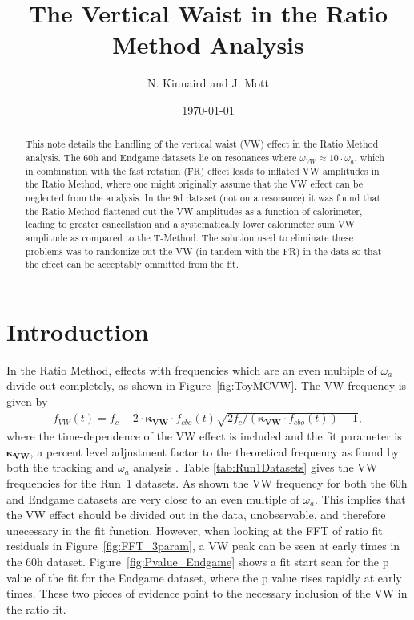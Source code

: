 \documentclass[12pt,letterpaper]{article}
\title{The Vertical Waist in the Ratio Method Analysis}
\author{N. Kinnaird and J. Mott}
\date{\today}
\newcommand{\figref}[1]{Figure~\ref{#1}}
\def\wa{$\omega_{a}$\xspace}
\begin{document}
\maketitle

\begin{abstract}
This note details the handling of the vertical waist (VW) effect in the Ratio Method analysis. The 60h and Endgame datasets lie on resonances where $\omega_{VW} \approx 10 \cdot \omega_{a}$, which in combination with the fast rotation (FR) effect leads to inflated VW amplitudes in the Ratio Method, where one might originally assume that the VW effect can be neglected from the analysis. In the 9d dataset (not on a resonance) it was found that the Ratio Method flattened out the VW amplitudes as a function of calorimeter, leading to greater cancellation and a systematically lower calorimeter sum VW amplitude as compared to the T-Method. The solution used to eliminate these problems was to randomize out the VW (in tandem with the FR) in the data so that the effect can be acceptably ommitted from the fit.
\end{abstract}


\section{Introduction}

In the Ratio Method, effects with frequencies which are an even multiple of \wa divide out completely, as shown in \figref{fig:ToyMCVW}. The VW frequency is given by
    \begin{align} \label{eq:VWfreqKappa}
        f_{VW}(t) = f_{c} - 2 \cdot \boldsymbol{\kappa_{VW}} \cdot f_{cbo}(t)\sqrt{2f_{c}/(\boldsymbol{\kappa_{VW}} \cdot f_{cbo}(t))-1},
    \end{align}
where the time-dependence of the VW effect is included and the fit parameter is $\boldsymbol{\kappa_{VW}}$, a percent level adjustment factor to the theoretical frequency as found by both the tracking and \wa analysis \cite{cbofrequency}. Table \ref{tab:Run1Datasets} gives the VW frequencies for the Run~1 datasets. As shown the VW frequency for both the 60h and Endgame datasets are very close to an even multiple of \wa. This implies that the VW effect should be divided out in the data, unobservable, and therefore unecessary in the fit function. However, when looking at the FFT of ratio fit residuals in \figref{fig:FFT_3param}, a VW peak can be seen at early times in the 60h dataset. \figref{fig:Pvalue_Endgame} shows a fit start scan for the p value of the fit for the Endgame dataset, where the p value rises rapidly at early times. These two pieces of evidence point to the necessary inclusion of the VW in the ratio fit.
\end{document}
